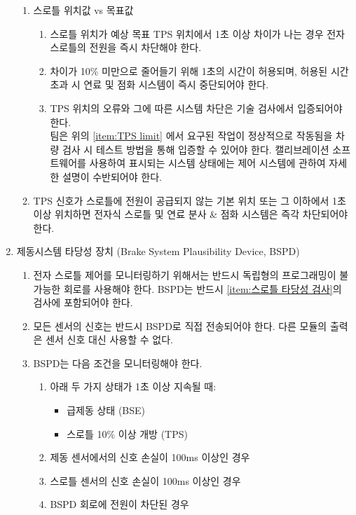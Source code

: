 \documentclass[final,a4paper,10pt]{report}
\begin{document}
\begin{enumerate}
\begin{enumerate}
      \item 스로틀 위치값 vs 목표값
        \begin{enumerate}
          \item 스로틀 위치가 예상 목표 TPS 위치에서 1초 이상 차이가 나는 경우 전자 스로틀의 전원을 즉시 차단해야 한다.
          \item 차이가 10\% 미만으로 줄어들기 위해 1초의 시간이 허용되며, 허용된 시간 초과 시 연료 및 점화 시스템이 즉시 중단되어야 한다. \label{item:TPS limit}
          \item TPS 위치의 오류와 그에 따른 시스템 차단은 기술 검사에서 입증되어야 한다.\\
            팀은 위의 \cref{item:TPS limit} 에서 요구된 작업이 정상적으로 작동됨을 차량 검사 시 테스트 방법을 통해 입증할 수 있어야 한다. 캘리브레이션 소프트웨어를 사용하여 표시되는 시스템 상태에는 제어 시스템에 관하여 자세한 설명이 수반되어야 한다.
        \end{enumerate}

      \item TPS 신호가 스로틀에 전원이 공급되지 않는 기본 위치 또는 그 이하에서 1초 이상 위치하면 전자식 스로틀 및 연료 분사 \& 점화 시스템은 즉각 차단되어야 한다.
    \end{enumerate}
    
  \item 제동시스템 타당성 장치 (Brake System Plausibility Device, BSPD)
    \begin{enumerate}
      \item 전자 스로틀 제어를 모니터링하기 위해서는 반드시 독립형의 프로그래밍이 불가능한 회로를 사용해야 한다. BSPD는 반드시 \cref{item:스로틀 타당성 검사}의 검사에 포함되어야 한다.
      \item 모든 센서의 신호는 반드시 BSPD로 직접 전송되어야 한다. 다른 모듈의 출력은 센서 신호 대신 사용할 수 없다.
      
      \item BSPD는 다음 조건을 모니터링해야 한다.
        \begin{enumerate}
          \item 아래 두 가지 상태가 1초 이상 지속될 때:
            \begin{itemize}
              \item 급제동 상태 (BSE)
              \item 스로틀 10\% 이상 개방 (TPS)
            \end{itemize}
          \item 제동 센서에서의 신호 손실이 100ms 이상인 경우
          \item 스로틀 센서의 신호 손실이 100ms 이상인 경우
          \item BSPD 회로에 전원이 차단된 경우
        \end{enumerate}
        

\end{enumerate}
\end{enumerate}
\end{document}
